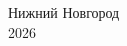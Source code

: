 \begin{titlepage}
    \vspace{\fill}

    \begin{center}
        Нижний Новгород\\2026
    \end{center}

\end{titlepage}
